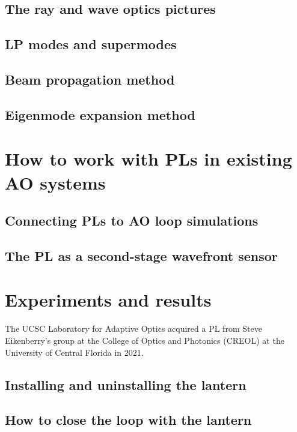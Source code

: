 \documentclass[12pt]{article}
\begin{document}
\subsection{The ray and wave optics pictures}

\subsection{LP modes and supermodes}

\subsection{Beam propagation method}

\subsection{Eigenmode expansion method}

\section{How to work with PLs in existing AO systems}

\subsection{Connecting PLs to AO loop simulations}

\subsection{The PL as a second-stage wavefront sensor}

\section{Experiments and results}

The UCSC Laboratory for Adaptive Optics acquired a PL from Steve Eikenberry's group at the College of Optics and Photonics (CREOL) at the University of Central Florida in 2021. 

\subsection{Installing and uninstalling the lantern}

\subsection{How to close the loop with the lantern}
\end{document}
